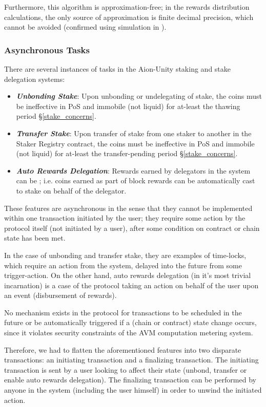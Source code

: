 Furthermore, this algorithm is approximation-free; in the rewards distribution calculations, the only source of approximation is finite decimal precision, which cannot be avoided (confirmed using simulation in \cite{Sha19}).  

\subsubsection{Asynchronous Tasks}
There are several instances of  tasks in the Aion-Unity staking and stake delegation systems: 
\begin{itemize}
    \item \textit{\textbf{Unbonding Stake}}: Upon unbonding or undelegating of stake, the coins must be ineffective in PoS and immobile (not liquid) for at-least the thawing period \S\ref{stake_concerns}.  
    \item \textit{\textbf{Transfer Stake}}: Upon transfer of stake from one staker to another in the Staker Registry contract, the coins must be ineffective in PoS and immobile (not liquid) for at-least the transfer-pending period \S\ref{stake_concerns}.  
    \item \textit{\textbf{Auto Rewards Delegation}}: Rewards earned by delegators in the system can be ; i.e. coins earned as part of block rewards can be automatically cast to stake on behalf of the delegator.  
\end{itemize}

These features are asynchronous in the sense that they cannot be implemented within one transaction initiated by the user; they require some action by the protocol itself (not initiated by a user), after some condition on contract or chain state has been met.   

In the case of unbonding and transfer stake, they are examples of time-locks, which require an action from the system, delayed into the future from some trigger-action. On the other hand, auto rewards delegation (in it's most trivial incarnation) is a case of the protocol taking an action on behalf of the user upon an event (disbursement of rewards). 

No mechanism exists in the protocol for transactions to be scheduled in the future or be automatically triggered if a (chain or contract) state change occurs, since it violates security constraints of the AVM computation metering system. 

Therefore, we had to flatten the aforementioned features into two disparate transactions: an initiating transaction and a finalizing transaction. The initiating transaction is sent by a user looking to affect their state (unbond, transfer or enable auto rewards delegation). The finalizing transaction can be performed by anyone in the system (including the user himself) in order to unwind the initiated action.

